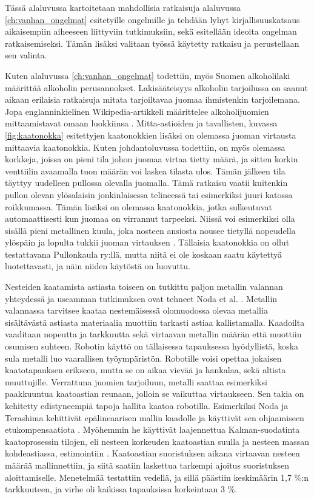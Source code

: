 Tässä alaluvussa kartoitetaan mahdollisia ratkaisuja alaluvussa \ref{ch:vanhan_ongelmat} esitetyille ongelmille ja tehdään lyhyt kirjallisuuskatsaus aikaisempiin aiheeseen liittyviin tutkimuksiin, sekä esitellään ideoita ongelman ratkaisemiseksi. Tämän lisäksi valitaan työssä käytetty ratkaisu ja perustellaan sen valinta.

Kuten alaluvussa \ref{ch:vanhan_ongelmat} todettiin, myös Suomen alkoholilaki määrittää alkoholin perusannokset. Lakisääteisyys alkoholin tarjoilussa on saanut aikaan erilaisia ratkaisuja mitata tarjoiltavaa juomaa ihmistenkin tarjoilemana. Jopa englanninkielinen Wikipedia-artikkeli määrittelee alkoholijuomien mittaamistavat omaan luokkiinsa \cite{Wikipedia}. Mitta-astioiden ja tavallisten, kuvassa \ref{fig:kaatonokka} esitettyjen kaatonokkien lisäksi on olemassa juoman virtausta mittaavia kaatonokkia. Kuten johdantoluvussa todettiin, on myös olemassa korkkeja, joissa on pieni tila johon juomaa virtaa tietty määrä, ja sitten korkin venttiilin avaamalla tuon määrän voi laskea tilasta ulos. Tämän jälkeen tila täyttyy uudelleen pullossa olevalla juomalla. Tämä ratkaisu vaatii kuitenkin pullon olevan ylösalaisin jonkinlaisessa telineessä tai esimerkiksi juuri katossa roikkumassa. Tämän lisäksi on olemassa kaatonokkia, jotka sulkeutuvat automaattisesti kun juomaa on virrannut tarpeeksi. Niissä voi esimerkiksi olla sisällä pieni metallinen kuula, joka nosteen ansiosta nousee tietyllä nopeudella ylöspäin ja lopulta tukkii juoman virtauksen \cite{Barproducts}. Tällaisia kaatonokkia on ollut testattavana Pullonkaula ry:llä, mutta niitä ei ole koskaan saatu käytettyä luotettavasti, ja näin niiden käytöstä on luovuttu.

Nesteiden kaatamista astiasta toiseen on tutkittu paljon metallin valannan yhteydessä ja useamman tutkimuksen ovat tehneet Noda et al. \cite{Noda2007,Noda2008,Noda2009}. Metallin valannassa tarvitsee kaataa nestemäisessä olomuodossa olevaa metallia sisältävästä astiasta materiaalia muottiin tarkasti astiaa kallistamalla. Kaadoilta vaaditaan nopeutta ja tarkkuutta sekä virtaavan metallin määrän että muottiin osumisen suhteen. Robotin käyttö on tällaisessa tapauksessa hyödyllistä, koska sula metalli luo vaarallisen työympäristön. Robotille voisi opettaa jokaisen kaatotapauksen erikseen, mutta se on aikaa vievää ja hankalaa, sekä altista muuttujille. Verrattuna juomien tarjoiluun, metalli saattaa esimerkiksi paakkuuntua kaatoastian reunaan, jolloin se vaikuttaa virtaukseen. Sen takia on kehitetty edistyneempiä tapoja hallita kaatoa robotilla. Esimerkiksi Noda ja Terashima kehittivät epälineaarisen mallin kaadolle ja käyttivät sen ohjaamiseen etukompensaatiota \cite{Noda2007}. Myöhemmin he käyttivät laajennettua Kalman-suodatinta kaatoprosessin tilojen, eli nesteen korkeuden kaatoastian suulla ja nesteen massan kohdeastiassa, estimointiin \cite{Noda2009}. Kaatoastian suoristuksen aikana virtaavan nesteen määrää mallinnettiin, ja siitä saatiin laskettua tarkempi ajoitus suoristuksen aloittamiselle. Menetelmää testattiin vedellä, ja sillä päästiin keskimäärin 1,7 \%:n tarkkuuteen, ja virhe oli kaikissa tapauksissa korkeintaan 3 \%.

